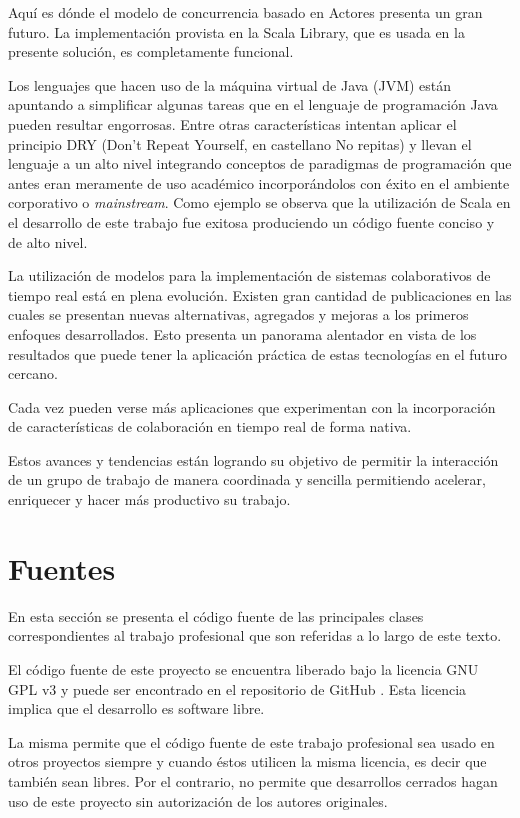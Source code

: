\documentclass[12pt,a4paper]{article}
\let\stdsection\section
\renewcommand\section{\newpage\stdsection}
\begin{document}
Aquí es dónde el modelo de concurrencia basado en Actores presenta un gran futuro. La implementación provista en la
Scala Library, que es usada en la presente solución, es completamente funcional.

Los lenguajes que hacen uso de la máquina virtual de Java (JVM) están apuntando a simplificar algunas tareas que en el lenguaje
de programación Java pueden resultar engorrosas. Entre otras características intentan aplicar el principio DRY (Don't Repeat
Yourself, en castellano No repitas) y llevan el lenguaje a un alto nivel integrando conceptos de paradigmas de 
programación que antes eran meramente de uso académico incorporándolos con éxito en el ambiente corporativo o \textit{mainstream}.
Como ejemplo se observa que la utilización de Scala en el desarrollo de este trabajo fue exitosa produciendo un código fuente
conciso y de alto nivel.

La utilización de modelos para la implementación de sistemas colaborativos de tiempo real está en plena evolución.
Existen gran cantidad de publicaciones en las cuales se presentan nuevas alternativas, agregados y mejoras a los
primeros enfoques desarrollados. Esto presenta un panorama alentador en vista de los resultados que puede tener la aplicación práctica
de estas tecnologías en el futuro cercano.

Cada vez pueden verse más aplicaciones que experimentan con la incorporación de características de colaboración en tiempo real de
forma nativa.

Estos avances y tendencias están logrando su objetivo de permitir la interacción de un grupo de trabajo de manera coordinada y
sencilla permitiendo acelerar, enriquecer y hacer más productivo su trabajo.

\section{Fuentes}

En esta sección se presenta el código fuente de las principales clases correspondientes al trabajo profesional que
son referidas a lo largo de este texto.

El código fuente de este proyecto se encuentra liberado bajo la licencia GNU GPL v3 \cite{gpl} y puede ser encontrado
en el repositorio de GitHub \cite{github}. Esta licencia implica que el desarrollo es software libre.

La misma permite que el código fuente de este trabajo profesional sea usado en otros proyectos siempre y cuando
éstos utilicen la misma licencia, es decir que también sean libres. Por el contrario, no permite que desarrollos
cerrados hagan uso de este proyecto sin autorización de los autores originales.
\end{document}
